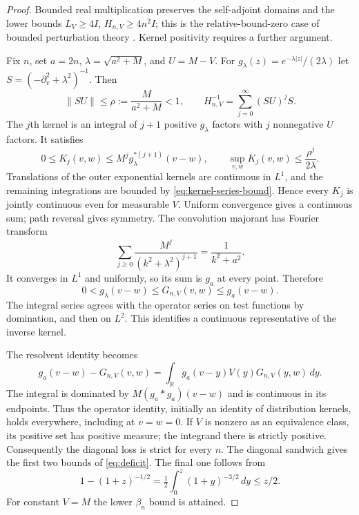 \documentclass[11pt,letterpaper]{article}
\numberwithin{equation}{section}
\theoremstyle{remark}
\newcommand{\R}{\mathbb R}
\newcommand{\dd}{\,d}
\begin{document}
\begin{proof}
Bounded real multiplication preserves the self-adjoint domains and
the lower bounds \(L_V\ge4I\), \(H_{n,V}\ge4n^2I\); this is the
relative-bound-zero case of bounded perturbation theory
\cite[Theorem 6.4]{Teschl}. Kernel positivity requires a further
argument.

Fix \(n\), set \(a=2n\), \(\lambda=\sqrt{a^2+M}\), and \(U=M-V\).
For \(g_\lambda(z)=e^{-\lambda|z|}/(2\lambda)\) let
\(S=(-\partial_v^2+\lambda^2)^{-1}\).
Then
\begin{equation}
 \|SU\|\le\rho:=\frac{M}{a^2+M}<1,\qquad
 H_{n,V}^{-1}=\sum_{j=0}^\infty(SU)^jS. \label{eq:positive-series}
\end{equation}
The \(j\)th kernel is an integral of \(j+1\) positive
\(g_\lambda\) factors with \(j\) nonnegative \(U\) factors.
It satisfies
\begin{equation}
 0\le K_j(v,w)\le M^j g_\lambda^{*(j+1)}(v-w),\qquad
 \sup_{v,w}K_j(v,w)\le\frac{\rho^j}{2\lambda}.
 \label{eq:kernel-series-bound}
\end{equation}
Translations of the outer exponential kernels are continuous in
\(L^1\), and the remaining integrations are bounded by
\eqref{eq:kernel-series-bound}. Hence every \(K_j\) is jointly
continuous even for measurable \(V\). Uniform convergence gives a
continuous sum; path reversal gives symmetry. The convolution
majorant has Fourier transform
\[
 \sum_{j\ge0}\frac{M^j}{(k^2+\lambda^2)^{j+1}}
 =\frac1{k^2+a^2}.
\]
It converges in \(L^1\) and uniformly, so its sum is \(g_a\) at
every point. Therefore
\begin{equation}
 0<g_\lambda(v-w)\le G_{n,V}(v,w)\le g_a(v-w).
 \label{eq:kernel-sandwich}
\end{equation}
The integral series agrees with the operator series on test
functions by domination, and then on \(L^2\). This identifies a
continuous representative of the inverse kernel.

The resolvent identity becomes
\begin{equation}
 g_a(v-w)-G_{n,V}(v,w)
 =\int_\R g_a(v-y)V(y)G_{n,V}(y,w)\dd y. \label{eq:resolvent-kernel}
\end{equation}
The integral is dominated by \(M(g_a*g_a)(v-w)\) and is continuous
in its endpoints. Thus the operator identity, initially an identity
of distribution kernels, holds everywhere, including at \(v=w=0\).
If \(V\) is nonzero as an equivalence class, its positive set has positive
measure; the integrand there is strictly positive. Consequently
the diagonal loss is strict for every \(n\).
The diagonal sandwich gives the first two bounds of
\eqref{eq:deficit}. The final one follows from
\[
 1-(1+z)^{-1/2}
 =\tfrac12\int_0^z(1+y)^{-3/2}\dd y\le z/2.
\]
For constant \(V=M\) the lower \(\beta_n\) bound is attained.


\end{proof}
\end{document}
